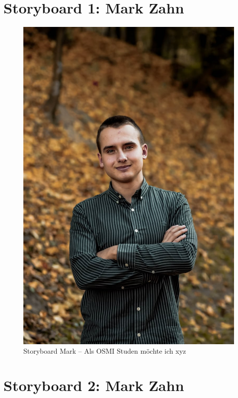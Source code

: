 \documentclass{article}
\begin{document}
\newpage

\section{Storyboard 1: Mark Zahn}

\begin{figure}[h]
	\includegraphics[angle=90,width=\textwidth]{mark}
	\centering
	\caption{Storyboard Mark – Als OSMI Studen möchte ich xyz}
\end{figure}

\newpage

\section{Storyboard 2: Mark Zahn}
\end{document}
